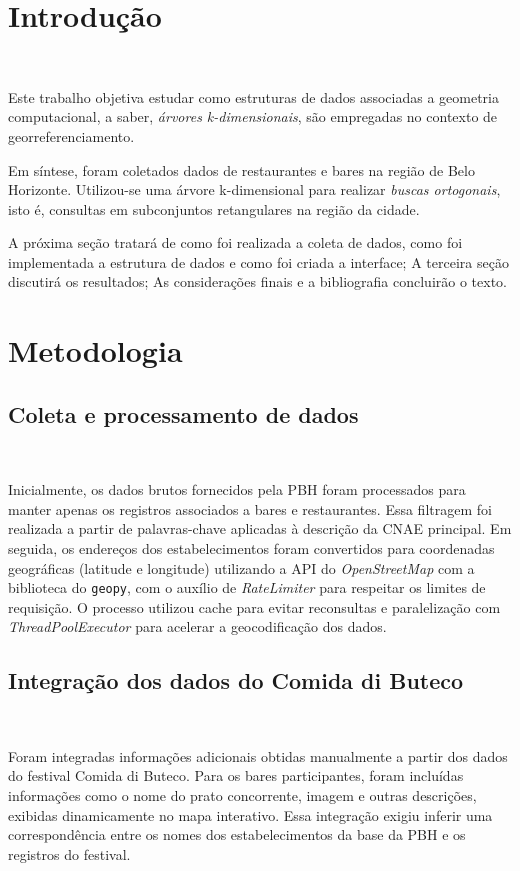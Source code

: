 \documentclass{article}
\begin{document}
\begin{adjustwidth}{-1.5cm}{-1.5cm}

\section{Introdução}
\ 

Este trabalho objetiva estudar como estruturas de dados associadas a geometria computacional, a saber, \textit{árvores k-dimensionais}, são empregadas no contexto de georreferenciamento.

Em síntese, foram coletados dados de restaurantes e bares na região de Belo Horizonte. Utilizou-se uma árvore k-dimensional para realizar \textit{buscas ortogonais}, isto é, consultas em subconjuntos retangulares na região da cidade.

A próxima seção tratará de como foi realizada a coleta de dados, como foi implementada a estrutura de dados e como foi criada a interface; A terceira seção discutirá os resultados; As considerações finais e a bibliografia concluirão o texto.

\section{Metodologia}

\subsection{Coleta e processamento de dados}
\ 

Inicialmente, os dados brutos fornecidos pela PBH foram processados para manter apenas os registros associados a bares e restaurantes. Essa filtragem foi realizada a partir de palavras-chave aplicadas à descrição da CNAE principal. Em seguida, os endereços dos estabelecimentos foram convertidos para coordenadas geográficas (latitude e longitude) utilizando a API do \textit{OpenStreetMap} com a biblioteca do \texttt{geopy}, com o auxílio de \textit{RateLimiter} para respeitar os limites de requisição. O processo utilizou cache para evitar reconsultas e paralelização com \textit{ThreadPoolExecutor} para acelerar a geocodificação dos dados.

\subsection{Integração dos dados do Comida di Buteco}
\ 

Foram integradas informações adicionais obtidas manualmente a partir dos dados do festival Comida di Buteco. Para os bares participantes, foram incluídas informações como o nome do prato concorrente, imagem e outras descrições, exibidas dinamicamente no mapa interativo. Essa integração exigiu inferir uma correspondência entre os nomes dos estabelecimentos da base da PBH e os registros do festival.


\end{adjustwidth}
\end{document}
